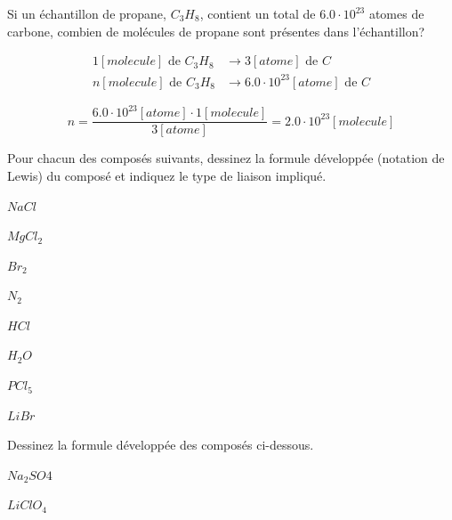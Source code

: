\documentclass[
  11pt,
  french,
  a4paper,
  openany]{book}
\begin{document}
\begin{Exercise}

Si un échantillon de propane, \(C_3H_8\), contient un total de \(6.0 \cdot 10^{23}\) atomes de carbone, combien de molécules de propane sont présentes dans l'échantillon?



\end{Exercise}

\begin{Answer}
\[ \begin{split}
  1 [molecule] \text{ de } C_3H_8 & \longrightarrow 3 [atome] \text{ de }  C \\
  n [molecule] \text{ de } C_3H_8 & \longrightarrow 6.0 \cdot 10^{23} [atome] \text{ de } C
  \end{split} \]

\[ n = \frac{6.0 \cdot 10^{23} [atome] \cdot 1 [molecule]}{3 [atome]} = 2.0 \cdot 10^{23} [molecule] \]

\end{Answer}

\newpage

\begin{Exercise}

Pour chacun des composés suivants, dessinez la formule développée (notation de Lewis) du composé et indiquez le type de liaison impliqué.

\begin{multicols}{4}
\(NaCl\)

\(MgCl_2\)

\(Br_2\)

\(N_2\)

\end{multicols}


\begin{multicols}{4}
\(HCl\)

\(H_2O\)

\(PCl_5\)

\(LiBr\)

\end{multicols}



\end{Exercise}

\begin{Exercise}

Dessinez la formule développée des composés ci-dessous.

\begin{multicols}{2}
\(Na_2SO4\)

\(LiClO_4\)

\end{multicols}



\end{Exercise}
\end{document}
